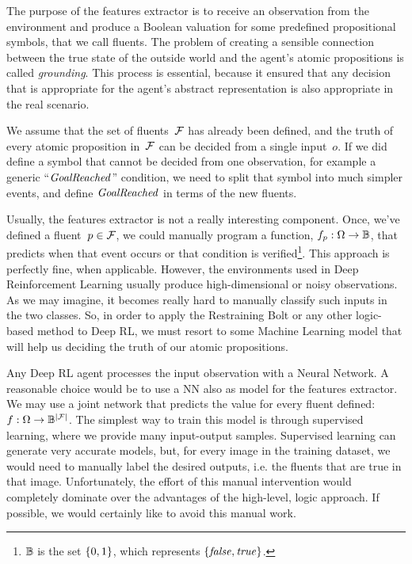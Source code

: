 The purpose of the features extractor is to receive an observation from the
environment and produce a Boolean valuation for some predefined propositional
symbols, that we call fluents. The problem of creating a sensible connection
between the true state of the outside world and the agent's atomic
propositions is called \emph{grounding}. This process is essential, because it
ensured that any decision that is appropriate for the agent's abstract
representation is also appropriate in the real scenario.

We assume that the set of fluents~$\mathcal{F}$ has already been defined, and the
truth of every atomic proposition in~$\mathcal{F}$ can be decided from a single
input~$o$. If we did define a symbol that cannot be decided from one
observation, for example a generic ``$\text{\textit{GoalReached}}$'' condition, we
need to split that symbol into much simpler events, and define
$\text{\textit{GoalReached}}$ in terms of the new fluents.

Usually, the features extractor is not a really interesting component. Once,
we've defined a fluent~$p \in \mathcal{F}$, we could manually program a
function, $f_p: \Omega \to \mathbb{B}$, that predicts when that event occurs or
that condition is verified\footnote{$\mathbb{B}$ is the set $\{0, 1\}$, which
represents $\{\text{\textit{false}}, \text{\textit{true}}\}$.}.  This approach is perfectly fine, when
applicable.  However, the environments used in Deep Reinforcement Learning
usually produce high-dimensional or noisy observations. As we may imagine, it
becomes really hard to manually classify such inputs in the two classes. So,
in order to apply the Restraining Bolt or any other logic-based method to Deep
RL, we must resort to some Machine Learning model that will help us deciding
the truth of our atomic propositions.

Any Deep RL agent processes the input observation with a Neural Network. A
reasonable choice would be to use a NN also as model for the features
extractor. We may use a joint network that predicts the value for every fluent
defined: $f: \Omega \to \mathbb{B}^{\lvert\mathcal{F}\rvert}$. The simplest way to train this
model is through supervised learning, where we provide many input-output
samples. Supervised learning can generate very accurate models, but, for every
image in the training dataset, we would need to manually label the desired
outputs, i.e. the fluents that are true in that image. Unfortunately, the
effort of this manual intervention would completely dominate over the
advantages of the high-level, logic approach. If possible, we would certainly
like to avoid this manual work. 

